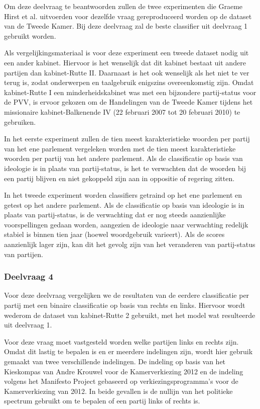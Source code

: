Om deze deelvraag te beantwoorden zullen de twee experimenten die Graeme Hirst et al. uitvoerden voor dezelfde vraag gereproduceerd worden op de dataset van de Tweede Kamer. Bij deze deelvraag zal de beste classifier uit deelvraag 1 gebruikt worden. \par
Als vergelijkingsmateriaal is voor deze experiment een tweede dataset nodig uit een ander kabinet. Hiervoor is het wenselijk dat dit kabinet bestaat uit andere partijen dan kabinet-Rutte II. Daarnaast is het ook wenselijk als het niet te ver terug is, zodat onderwerpen en taalgebruik enigszins overeenkomstig zijn. Omdat kabinet-Rutte I een minderheidskabinet was met een bijzondere partij-status voor de PVV, is ervoor gekozen om de Handelingen van de Tweede Kamer tijdens het missionaire kabinet-Balkenende IV (22 februari 2007 tot 20 februari 2010) te gebruiken.\par
In het eerste experiment zullen de tien meest karakteristieke woorden per partij van het ene parlement vergeleken worden met de tien meest karakteristieke woorden per partij van het andere parlement. Als de classificatie op basis van ideologie is in plaats van partij-status, is het te verwachten dat de woorden bij een partij blijven en niet gekoppeld zijn aan in oppositie of regering zitten. \par
In het tweede experiment worden classifiers getraind op het ene parlement en getest op het andere parlement. Als de classificatie op basis van ideologie is in plaats van partij-status, is de verwachting dat er nog steeds aanzienlijke voorspellingen gedaan worden, aangezien de ideologie naar verwachting redelijk stabiel is binnen tien jaar (hoewel woordgebruik varieert). Als de scores aanzienlijk lager zijn, kan dit het gevolg zijn van het veranderen van partij-status van partijen.\par

\subsubsection{Deelvraag 4}
Voor deze deelvraag vergelijken we de resultaten van de eerdere classificatie per partij met een binaire classificatie op basis van rechts en links. Hiervoor wordt wederom de dataset van kabinet-Rutte 2 gebruikt, met het model wat resulteerde uit deelvraag 1. \par
Voor deze vraag moet vastgesteld worden welke partijen links en rechts zijn. Omdat dit lastig te bepalen is en er meerdere indelingen zijn, wordt hier gebruik gemaakt van twee verschillende indelingen. De indeling op basis van het Kieskompas van Andre Krouwel voor de Kamerverkiezing 2012 en de indeling volgens het Manifesto Project\cite{Volkens:2017} gebaseerd op verkiezingsprogramma's voor de Kamerverkiezing van 2012. In beide gevallen is de nullijn van het politieke spectrum gebruikt om te bepalen of een partij links of rechts is.\par


